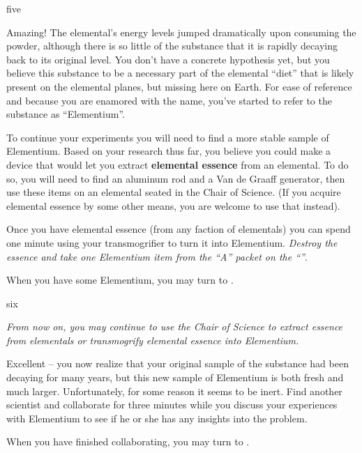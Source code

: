 \documentclass[notebook]{elementals}
\begin{document}
\begin{page}{five}

Amazing! The elemental's energy levels jumped dramatically upon consuming the powder, although there is so little of the substance that it is rapidly decaying back to its original level. You don't have a concrete hypothesis yet, but you believe this substance to be a necessary part of the elemental ``diet'' that is likely present on the elemental planes, but missing here on Earth. For ease of reference and because you are enamored with the name, you've started to refer to the substance as ``Elementium''.

To continue your experiments you will need to find a more stable sample of Elementium. Based on your research thus far, you believe you could make a device that would let you extract \textbf{elemental essence} from an elemental. To do so, you will need to find an aluminum rod and a Van de Graaff generator, then use these items on an elemental seated in the Chair of Science. (If you acquire elemental essence by some other means, you are welcome to use that instead).

Once you have elemental essence (from any faction of elementals) you can spend one minute using your transmogrifier to turn it into Elementium. \emph{Destroy the essence and take one Elementium item from the ``A'' packet on the ``\sAziSciLabBench{}''}.

When you have some Elementium, you may turn to .

\end{page}

\begin{page}{six}

\emph{From now on, you may continue to use the Chair of Science to extract essence from elementals or transmogrify elemental essence into Elementium.}

Excellent -- you now realize that your original sample of the substance had been decaying for many years, but this new sample of Elementium is both fresh and much larger. Unfortunately, for some reason it seems to be inert. Find another scientist and collaborate for three minutes while you discuss your experiences with Elementium to see if he or she has any insights into the problem.

When you have finished collaborating, you may turn to .

\end{page}
\end{document}
